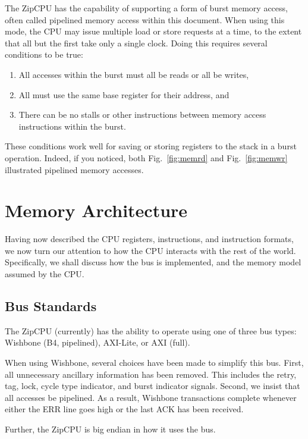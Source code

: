 \documentclass{gqtekspec}
\begin{document}
\begin{itemize}
	The ZipCPU has the capability of supporting a form of burst memory
	access, often called pipelined memory access within this document.
	When using this mode, the CPU may issue multiple load or store requests
	at a time, to the extent that all but the first take only a single
	clock.  Doing this requires several conditions to be true:
\begin{enumerate}
\item All accesses within the burst must all be reads or all be writes,
\item All must use the same base register for their address, and
\item There can be no stalls or other instructions between memory
	access instructions within the burst. 
\end{enumerate}
	These conditions work well for saving or storing registers to the stack
	in a burst operation.  Indeed, if you noticed, both
	Fig.~\ref{fig:memrd} and Fig.~\ref{fig:memwr} illustrated pipelined
	memory accesses.
\end{itemize}
\fi

\section{Memory Architecture}
Having now described the CPU registers, instructions, and instruction formats,
we now turn our attention to how the CPU interacts with the rest of the world.
Specifically, we shall discuss how the bus is implemented, and the memory
model assumed by the CPU.

\subsection{Bus Standards}\label{ssec:bus}
The ZipCPU (currently) has the ability to operate using one of three bus types:
Wishbone (B4, pipelined), AXI-Lite, or AXI (full).

When using Wishbone, several choices have been made to simplify this bus.
First, all unnecessary ancillary information has been removed.  This includes
the retry, tag, lock, cycle type indicator, and burst indicator signals.
Second, we insist that all accesses be pipelined.  As a result, Wishbone
transactions complete whenever either the ERR line goes high or the last ACK
has been received.

Further, the ZipCPU is big endian in how it uses the bus.
\end{document}
